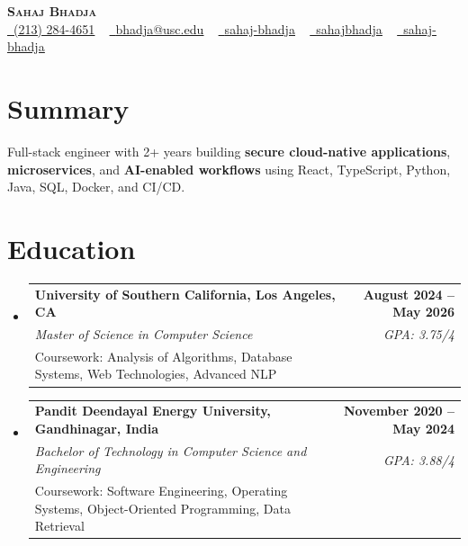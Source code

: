 \documentclass[letterpaper,10pt]{article}
\makeatletter
\newcommand{\resumeEduSubheading}[5]{\vspace{-1pt}\item\begin{tabular*}{1.0\textwidth}[t]{l@{\extracolsep{\fill}}r}\textbf{#1} & \textbf{\small #2} \\\textit{\small #3} & \textit{\small #4} \\\small #5 & \\\end{tabular*}\vspace{-2pt}}
\newcommand{\resumeSubHeadingListStart}{\begin{itemize}[leftmargin=0.0in, label={}]}
\newcommand{\resumeSubHeadingListEnd}{\end{itemize}}
\makeatother
\begin{document}
\begin{center}
{\Huge \scshape \textbf{Sahaj Bhadja}} \\ \vspace{1pt}
\small \href{tel:(213) 284-4651}{\faPhone\ \underline{(213) 284-4651}} ~ \href{mailto: bhadja@usc.edu}{\raisebox{-0.2\height}\faEnvelope\ \underline{bhadja@usc.edu}} ~
\href{https://www.linkedin.com/in/sahaj-bhadja/}{\raisebox{-0.2\height}\faLinkedin\ \underline{sahaj-bhadja}} ~ \href{https://github.com/SAHAJ-BHADJA}{\raisebox{-0.2\height}\faGithub\ \underline{sahajbhadja}} ~
\href{https://sahaj-bhadja.vercel.app/}{\raisebox{-0.2\height}\faGlobe\ \underline{sahaj-bhadja}}
\end{center}
\vspace{-20pt}
\section{Summary}
\begin{itemize}[leftmargin=0.15in, label={}]
\small{\item{Full-stack engineer with 2+ years building \textbf{secure cloud-native applications}, \textbf{microservices}, and \textbf{AI-enabled workflows} using React, TypeScript, Python, Java, SQL, Docker, and CI/CD.}}
\end{itemize}
\vspace{-18pt}
\section{Education}
\resumeSubHeadingListStart
\resumeEduSubheading{University of Southern California, Los Angeles, CA}{August 2024 -- May 2026}{Master of Science in Computer Science}{GPA: 3.75/4}{Coursework: Analysis of Algorithms, Database Systems, Web Technologies, Advanced NLP}
\vspace{-9pt}
\resumeEduSubheading{Pandit Deendayal Energy University, Gandhinagar, India}{November 2020 -- May 2024}{Bachelor of Technology in Computer Science and Engineering}{GPA: 3.88/4}{Coursework: Software Engineering, Operating Systems, Object-Oriented Programming, Data Retrieval}
\resumeSubHeadingListEnd
\vspace{-20pt}
\end{document}
